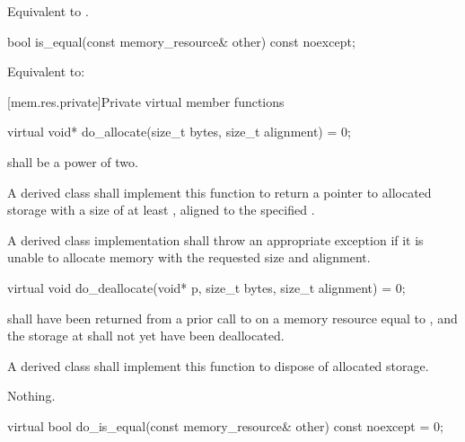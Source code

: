 \begin{itemdescr}
\pnum
\effects
Equivalent to .
\end{itemdescr}

%
\begin{itemdecl}
bool is_equal(const memory_resource& other) const noexcept;
\end{itemdecl}

\begin{itemdescr}
\pnum
\effects
Equivalent to: 
\end{itemdescr}


[mem.res.private]{Private virtual member functions}

%
\begin{itemdecl}
virtual void* do_allocate(size_t bytes, size_t alignment) = 0;
\end{itemdecl}

\begin{itemdescr}
\pnum
\requires
{} shall be a power of two.

\pnum
\returns
A derived class shall implement this function to
return a pointer to allocated storage
with a size of at least ,
aligned to the specified .

\pnum
\throws
A derived class implementation shall throw an appropriate exception if it is unable to allocate memory with the requested size and alignment.
\end{itemdescr}

%
\begin{itemdecl}
virtual void do_deallocate(void* p, size_t bytes, size_t alignment) = 0;
\end{itemdecl}

\begin{itemdescr}
\pnum
\requires
{} shall have been returned from a prior call to  on a memory resource equal to ,
and the storage at  shall not yet have been deallocated.

\pnum
\effects
A derived class shall implement this function to dispose of allocated storage.

\pnum
\throws
Nothing.
\end{itemdescr}

%
\begin{itemdecl}
virtual bool do_is_equal(const memory_resource& other) const noexcept = 0;
\end{itemdecl}

